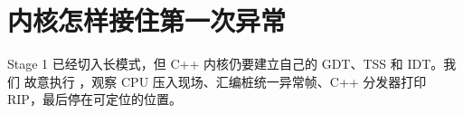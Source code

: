 \chapter{内核怎样接住第一次异常}

Stage 1 已经切入长模式，但 C++ 内核仍要建立自己的 GDT、TSS 和 IDT。我们
故意执行 ，观察 CPU 压入现场、汇编桩统一异常帧、C++ 分发器打印
RIP，最后停在可定位的位置。




